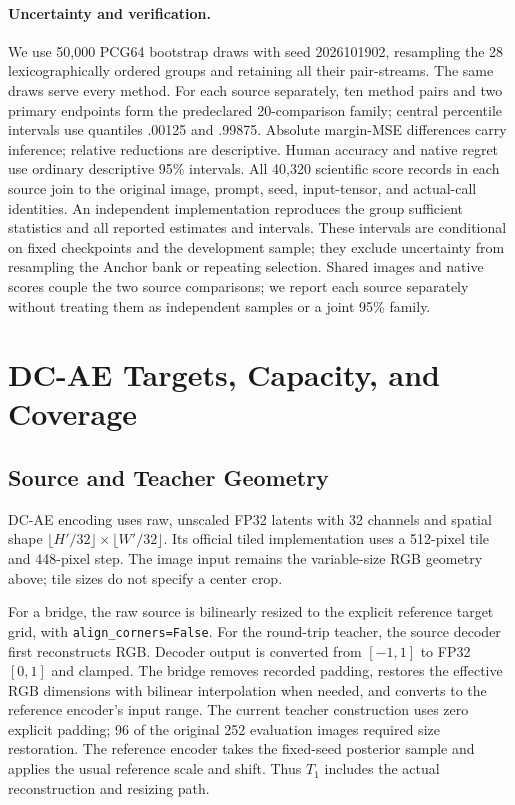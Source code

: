 \documentclass[10pt,twocolumn,letterpaper]{article}
\begin{document}
\paragraph{Uncertainty and verification.}
We use 50,000 PCG64 bootstrap draws with seed 2026101902, resampling the 28 lexicographically ordered groups and retaining all their pair-streams. The same draws serve every method. For each source separately, ten method pairs and two primary endpoints form the predeclared 20-comparison family; central percentile intervals use quantiles .00125 and .99875. Absolute margin-MSE differences carry inference; relative reductions are descriptive. Human accuracy and native regret use ordinary descriptive 95\% intervals. All 40,320 scientific score records in each source join to the original image, prompt, seed, input-tensor, and actual-call identities. An independent implementation reproduces the group sufficient statistics and all reported estimates and intervals. These intervals are conditional on fixed checkpoints and the development sample; they exclude uncertainty from resampling the Anchor bank or repeating selection. Shared images and native scores couple the two source comparisons; we report each source separately without treating them as independent samples or a joint 95\% family.

\section{DC-AE Targets, Capacity, and Coverage}
\subsection{Source and Teacher Geometry}
DC-AE encoding uses raw, unscaled FP32 latents with 32 channels and spatial shape $\lfloor H'/32\rfloor\times\lfloor W'/32\rfloor$. Its official tiled implementation uses a 512-pixel tile and 448-pixel step. The image input remains the variable-size RGB geometry above; tile sizes do not specify a center crop.

For a bridge, the raw source is bilinearly resized to the explicit reference target grid, with \texttt{align\_corners=False}. For the round-trip teacher, the source decoder first reconstructs RGB. Decoder output is converted from $[-1,1]$ to FP32 $[0,1]$ and clamped. The bridge removes recorded padding, restores the effective RGB dimensions with bilinear interpolation when needed, and converts to the reference encoder's input range. The current teacher construction uses zero explicit padding; 96 of the original 252 evaluation images required size restoration. The reference encoder takes the fixed-seed posterior sample and applies the usual reference scale and shift. Thus $T_1$ includes the actual reconstruction and resizing path.
\end{document}
